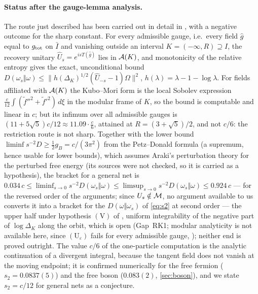 \paragraph{Status after the gauge-lemma analysis.}
The route just described has been carried out in detail in \cite{RigorRK}, with a negative outcome for the sharp constant.  For every admissible gauge, i.e.\ every field $\hat g$ equal to $g_{\rm tot}$ on $\bar I$ and vanishing outside an interval $K=(-\infty,R)\supseteq I$, the recovery unitary $\hat U_s=e^{isT(\hat g)}$ lies in $\mathcal A(K)$, and monotonicity of the relative entropy gives the exact, unconditional bound $D(\omega_s\Vert\omega)\le\|h(\Delta_K)^{1/2}(\hat U_{-s}-1)\Omega\|^2$, $h(\lambda)=\lambda-1-\log\lambda$.  For fields affiliated with $\mathcal A(K)$ the Kubo--Mori form is the local Sobolev expression $\frac c{12}\int(\tilde f''^2+\tilde f'^2)\,d\xi$ in the modular frame of $K$, so the bound is computable and linear in $c$; but its infimum over all admissible gauges is $(11+5\sqrt5)c/12\approx11.09\cdot\frac c6$, attained at $R=(3+\sqrt5)/2$, and not $c/6$: the restriction route is not sharp.  Together with the lower bound $\liminf s^{-2}D\ge\frac12 g_B=c/(3\pi^2)$ from the Petz--Donald formula (a supremum, hence usable for lower bounds), which assumes Araki's perturbation theory for the perturbed free energy (its sources were not checked, so it is carried as a hypothesis), the bracket for a general net is $0.034\,c\le\liminf_{s\to0}s^{-2}D(\omega_{s}\Vert\omega)\le\limsup_{s\to0}s^{-2}D(\omega_{s}\Vert\omega)\le0.924\,c$ --- for the reversed order of the arguments; since $U_{s}\notin\mathcal M$, no argument available to us converts it into a bracket for the $D(\omega\Vert\omega_{s})$ of \eqref{eq:s2} at second order --- the upper half under hypothesis $(\mathrm V)$ of \cite[Def.~4.3]{RigorRK}, uniform integrability of the negative part of $\log\Delta_K$ along the orbit, which is open (Gap~RK1; modular analyticity is not available here, since $(\mathrm U_{\varepsilon})$ fails for every admissible gauge, \cite[Prop.~4.1]{RigorRK}); neither end is proved outright.  The value $c/6$ of the one-particle computation is the analytic continuation of a divergent integral, because the tangent field does not vanish at the moving endpoint; it is confirmed numerically for the free fermion ($s_2=0.0837(5)$) and the free boson ($0.083(2)$, \cref{sec:boson}), and we state $s_2=c/12$ for general nets as a conjecture.
